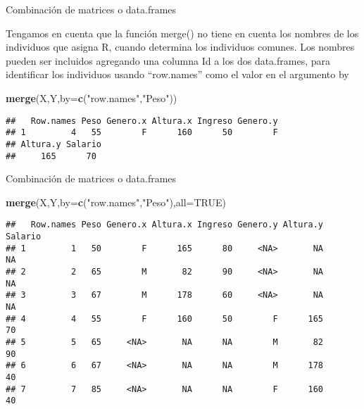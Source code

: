 \documentclass[ignorenonframetext,]{beamer}
\newenvironment{Shaded}{\begin{snugshade}}{\end{snugshade}}
\newcommand{\KeywordTok}[1]{\textcolor[rgb]{0.13,0.29,0.53}{\textbf{#1}}}
\newcommand{\DataTypeTok}[1]{\textcolor[rgb]{0.13,0.29,0.53}{#1}}
\newcommand{\StringTok}[1]{\textcolor[rgb]{0.31,0.60,0.02}{#1}}
\newcommand{\OtherTok}[1]{\textcolor[rgb]{0.56,0.35,0.01}{#1}}
\newcommand{\NormalTok}[1]{#1}
\begin{document}
\begin{frame}[fragile]{Combinación de matrices o data.frames}

Tengamos en cuenta que la función merge() no tiene en cuenta los nombres
de los individuos que asigna R, cuando determina los individuos comunes.
Los nombres pueden ser incluidos agregando una columna Id a los dos
data.frames, para identificar los individuos usando ``row.names'' como
el valor en el argumento by

\begin{Shaded}
\begin{Highlighting}[]
\KeywordTok{merge}\NormalTok{(X,Y,}\DataTypeTok{by=}\KeywordTok{c}\NormalTok{(}\StringTok{"row.names"}\NormalTok{,}\StringTok{"Peso"}\NormalTok{))}
\end{Highlighting}
\end{Shaded}

\begin{verbatim}
##   Row.names Peso Genero.x Altura.x Ingreso Genero.y 
## 1         4   55        F      160      50        F     
## Altura.y Salario
##     165      70

\end{verbatim}

\end{frame}

\begin{frame}[fragile]{Combinación de matrices o data.frames}

\begin{Shaded}
\begin{Highlighting}[]
\KeywordTok{merge}\NormalTok{(X,Y,}\DataTypeTok{by=}\KeywordTok{c}\NormalTok{(}\StringTok{"row.names"}\NormalTok{,}\StringTok{"Peso"}\NormalTok{),}\DataTypeTok{all=}\OtherTok{TRUE}\NormalTok{)}
\end{Highlighting}
\end{Shaded}

\begin{verbatim}
##   Row.names Peso Genero.x Altura.x Ingreso Genero.y Altura.y Salario
## 1         1   50        F      165      80     <NA>       NA      NA
## 2         2   65        M       82      90     <NA>       NA      NA
## 3         3   67        M      178      60     <NA>       NA      NA
## 4         4   55        F      160      50        F      165      70
## 5         5   65     <NA>       NA      NA        M       82      90
## 6         6   67     <NA>       NA      NA        M      178      40
## 7         7   85     <NA>       NA      NA        F      160      40
\end{verbatim}


\end{frame}
\end{document}

